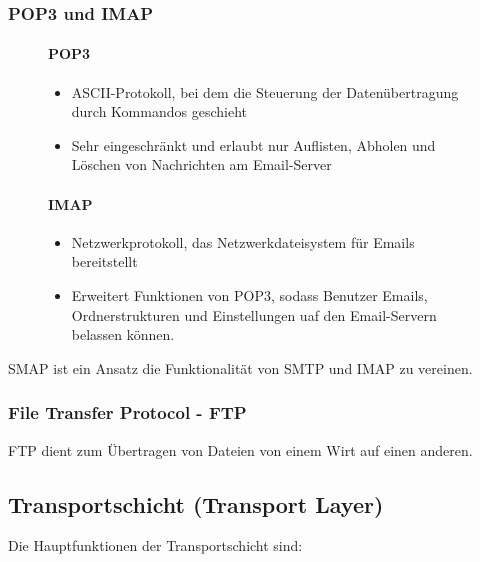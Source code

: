 \documentclass[12pt]{report}
\begin{document}
\subsubsection{POP3 und IMAP}
\begin{figure}[H]
  \begin{minipage}[t]{0.45\textwidth}
    \paragraph{POP3}
    \begin{itemize}
      \item ASCII-Protokoll, bei dem die Steuerung der Datenübertragung durch Kommandos geschieht
      \item Sehr eingeschränkt und erlaubt nur Auflisten, Abholen und Löschen von Nachrichten am Email-Server
    \end{itemize}
  \end{minipage}
  \hfill
  \begin{minipage}[t]{0.45\textwidth}
    \paragraph{IMAP}
    \begin{itemize}
      \item Netzwerkprotokoll, das Netzwerkdateisystem für Emails bereitstellt
      \item Erweitert Funktionen von POP3, sodass Benutzer Emails, Ordnerstrukturen und Einstellungen uaf den Email-Servern belassen können.
    \end{itemize}
  \end{minipage}
\end{figure}

\begin{infobox}
  SMAP ist ein Ansatz die Funktionalität von SMTP und IMAP zu vereinen.
\end{infobox}


\subsubsection{File Transfer Protocol - FTP}
\begin{defbox}
  FTP dient zum Übertragen von Dateien von einem Wirt auf einen anderen.
\end{defbox}

\subsection{Transportschicht (Transport Layer)}
Die Hauptfunktionen der Transportschicht sind:
\end{document}

